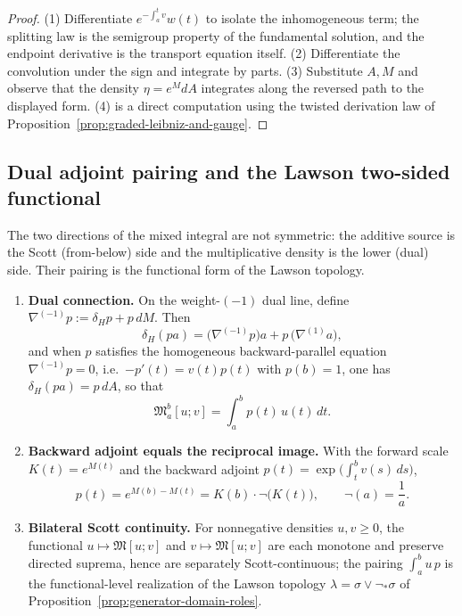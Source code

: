 \begin{proof}
(1) Differentiate $e^{-\int_a^t v}w(t)$ to isolate the inhomogeneous term; the
splitting law is the semigroup property of the fundamental solution, and the
endpoint derivative is the transport equation itself.  (2) Differentiate the
convolution under the sign and integrate by parts.  (3) Substitute $A,M$ and
observe that the density $\eta=e^M dA$ integrates along the reversed path to the
displayed form.  (4) is a direct computation using the twisted derivation law
of Proposition~\ref{prop:graded-leibniz-and-gauge}.
\end{proof}

\subsection{Dual adjoint pairing and the Lawson two-sided functional}

The two directions of the mixed integral are not symmetric: the additive source
is the Scott (from-below) side and the multiplicative density is the lower
(dual) side.  Their pairing is the functional form of the Lawson topology.

\begin{theorem}
\label{thm:lawson-dual-adjoint-pairing}
\begin{enumerate}
  \item \textbf{Dual connection.} On the weight-${(-1)}$ dual line, define
  $\nabla^{(-1)}p:=\delta_H p+p\,dM$.  Then
  \[
    \delta_H(pa)=\bigl(\nabla^{(-1)}p\bigr)a+p\,\bigl(\nabla^{(1)}a\bigr),
  \]
  and when $p$ satisfies the homogeneous backward-parallel equation
  $\nabla^{(-1)}p=0$, i.e.\ $-p'(t)=v(t)p(t)$ with $p(b)=1$, one has
  $\delta_H(pa)=p\,dA$, so that
  \[
    \mathfrak M_a^b[u;v]=\int_a^b p(t)\,u(t)\,dt .
  \]
  \item \textbf{Backward adjoint equals the reciprocal image.} With the forward
  scale $K(t)=e^{M(t)}$ and the backward adjoint
  $p(t)=\exp\!\bigl(\int_t^b v(s)\,ds\bigr)$,
  \[
    p(t)=e^{M(b)-M(t)}=K(b)\cdot\neg\bigl(K(t)\bigr),
    \qquad
    \neg(a)=\frac1a .
  \]
  \item \textbf{Bilateral Scott continuity.} For nonnegative densities
  $u,v\ge0$, the functional $u\mapsto\mathfrak M[u;v]$ and
  $v\mapsto\mathfrak M[u;v]$ are each monotone and preserve directed suprema,
  hence are separately Scott-continuous; the pairing $\int_a^b u\,p$ is the
  functional-level realization of the Lawson topology
  $\lambda=\sigma\vee\neg_*\sigma$ of
  Proposition~\ref{prop:generator-domain-roles}.
\end{enumerate}
\end{theorem}

